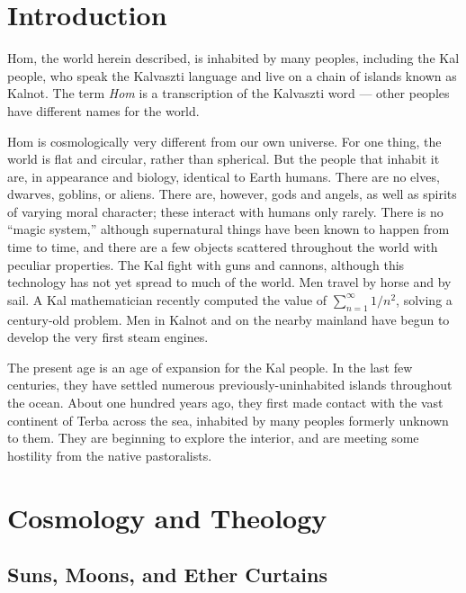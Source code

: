 \documentclass{article}
\title{\thetitle}
\author{\theauthor}
\begin{document}
\maketitle

\tableofcontents

\section{Introduction}

Hom, the world herein described, is inhabited by many peoples, including the Kal people, who speak the Kalvaszti language and live on a chain of islands known as Kalnot. The term \textit{Hom} is a transcription of the Kalvaszti word  --- other peoples have different names for the world.

Hom is cosmologically very different from our own universe. For one thing, the world is flat and circular, rather than spherical. But the people that inhabit it are, in appearance and biology, identical to Earth humans. There are no elves, dwarves, goblins, or aliens. There are, however, gods and angels, as well as spirits of varying moral character; these interact with humans only rarely. There is no ``magic system,'' although supernatural things have been known to happen from time to time, and there are a few objects scattered throughout the world with peculiar properties. The Kal fight with guns and cannons, although this technology has not yet spread to much of the world. Men travel by horse and by sail. A Kal mathematician recently computed the value of $\sum_{n = 1}^\infty 1/n^2$, solving a century-old problem. Men in Kalnot and on the nearby mainland have begun to develop the very first steam engines.

The present age is an age of expansion for the Kal people. In the last few centuries, they have settled numerous previously-uninhabited islands throughout the ocean. About one hundred years ago, they first made contact with the vast continent of Terba across the sea, inhabited by many peoples formerly unknown to them. They are beginning to explore the interior, and are meeting some hostility from the native pastoralists.  

\section{Cosmology and Theology}

\subsection{Suns, Moons, and Ether Curtains}
\end{document}
